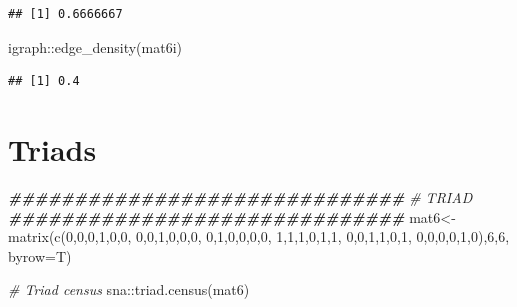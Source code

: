 \documentclass[
  notitlepage,
  onecolumn,
  openany]{book}
\newenvironment{Shaded}{\begin{snugshade}}{\end{snugshade}}
\newcommand{\AttributeTok}[1]{\textcolor[rgb]{0.77,0.63,0.00}{#1}}
\newcommand{\CommentTok}[1]{\textcolor[rgb]{0.56,0.35,0.01}{\textit{#1}}}
\newcommand{\DecValTok}[1]{\textcolor[rgb]{0.00,0.00,0.81}{#1}}
\newcommand{\DocumentationTok}[1]{\textcolor[rgb]{0.56,0.35,0.01}{\textbf{\textit{#1}}}}
\newcommand{\FunctionTok}[1]{\textcolor[rgb]{0.00,0.00,0.00}{#1}}
\newcommand{\NormalTok}[1]{#1}
\newcommand{\OtherTok}[1]{\textcolor[rgb]{0.56,0.35,0.01}{#1}}
\newcommand{\SpecialCharTok}[1]{\textcolor[rgb]{0.00,0.00,0.00}{#1}}
\begin{document}
\begin{verbatim}
## [1] 0.6666667
\end{verbatim}

\begin{Shaded}
\begin{Highlighting}[]
\NormalTok{igraph}\SpecialCharTok{::}\FunctionTok{edge\_density}\NormalTok{(mat6i)}
\end{Highlighting}
\end{Shaded}

\begin{verbatim}
## [1] 0.4
\end{verbatim}

\hypertarget{triads-1}{%
\section{Triads}\label{triads-1}}

\begin{Shaded}
\begin{Highlighting}[]
\DocumentationTok{\#\#\#\#\#\#\#\#\#\#\#\#\#\#\#\#\#\#\#\#\#\#\#\#\#\#\#\#\#\#}
\CommentTok{\# TRIAD}
\DocumentationTok{\#\#\#\#\#\#\#\#\#\#\#\#\#\#\#\#\#\#\#\#\#\#\#\#\#\#\#\#\#\#}
\NormalTok{mat6}\OtherTok{\textless{}{-}}\FunctionTok{matrix}\NormalTok{(}\FunctionTok{c}\NormalTok{(}\DecValTok{0}\NormalTok{,}\DecValTok{0}\NormalTok{,}\DecValTok{0}\NormalTok{,}\DecValTok{1}\NormalTok{,}\DecValTok{0}\NormalTok{,}\DecValTok{0}\NormalTok{,}
               \DecValTok{0}\NormalTok{,}\DecValTok{0}\NormalTok{,}\DecValTok{1}\NormalTok{,}\DecValTok{0}\NormalTok{,}\DecValTok{0}\NormalTok{,}\DecValTok{0}\NormalTok{,}
               \DecValTok{0}\NormalTok{,}\DecValTok{1}\NormalTok{,}\DecValTok{0}\NormalTok{,}\DecValTok{0}\NormalTok{,}\DecValTok{0}\NormalTok{,}\DecValTok{0}\NormalTok{,}
               \DecValTok{1}\NormalTok{,}\DecValTok{1}\NormalTok{,}\DecValTok{1}\NormalTok{,}\DecValTok{0}\NormalTok{,}\DecValTok{1}\NormalTok{,}\DecValTok{1}\NormalTok{,}
               \DecValTok{0}\NormalTok{,}\DecValTok{0}\NormalTok{,}\DecValTok{1}\NormalTok{,}\DecValTok{1}\NormalTok{,}\DecValTok{0}\NormalTok{,}\DecValTok{1}\NormalTok{,}
               \DecValTok{0}\NormalTok{,}\DecValTok{0}\NormalTok{,}\DecValTok{0}\NormalTok{,}\DecValTok{0}\NormalTok{,}\DecValTok{1}\NormalTok{,}\DecValTok{0}\NormalTok{),}\DecValTok{6}\NormalTok{,}\DecValTok{6}\NormalTok{, }\AttributeTok{byrow=}\NormalTok{T)}

\CommentTok{\# Triad census}
\NormalTok{sna}\SpecialCharTok{::}\FunctionTok{triad.census}\NormalTok{(mat6)}
\end{Highlighting}
\end{Shaded}
\end{document}
